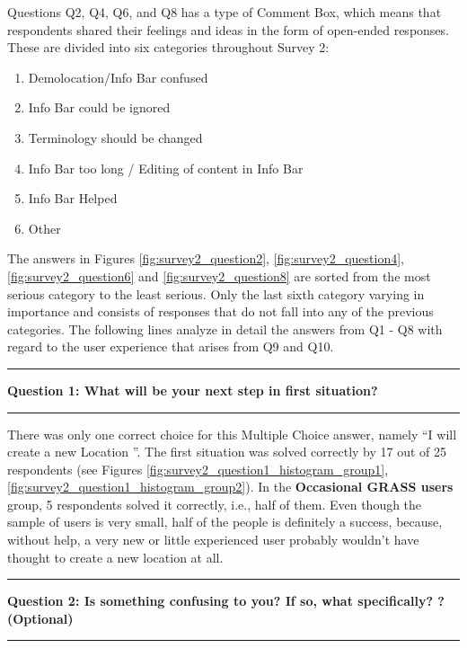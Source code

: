 \documentclass[a4paper,10pt,twoside]{article}
\begin{document}
\newpage
\noindent Questions Q2, Q4, Q6, and Q8 has a type of Comment Box,
which means that respondents shared their feelings and ideas in the
form of open-ended responses. These are divided into six categories
throughout Survey 2:

\begin{enumerate}
\item Demolocation/Info Bar confused
\item Info Bar could be ignored
\item Terminology should be changed
\item Info Bar too long / Editing of content in Info Bar
\item Info Bar Helped
\item Other
\end{enumerate}

\noindent The answers in Figures \ref{fig:survey2_question2},
\ref{fig:survey2_question4}, \ref{fig:survey2_question6} and
\ref{fig:survey2_question8} are sorted from the most serious category
to the least serious. Only the last sixth category varying in
importance and consists of responses that do not fall into any of the
previous categories. The following lines analyze in detail the answers
from Q1 - Q8 with regard to the user experience that arises from Q9
and Q10.

\par\noindent\rule{\textwidth}{0.4pt}
\noindent \textbf{Question 1: What will be your next step in first situation?}
\par\noindent\rule{\textwidth}{0.4pt}

\noindent There was only one correct choice for this Multiple Choice
answer, namely ``I will create a new Location ''. The first situation
was solved correctly by 17 out of 25 respondents (see Figures
\ref{fig:survey2_question1_histogram_group1},
\ref{fig:survey2_question1_histogram_group2}). In the
\textbf{Occasional GRASS users} group, 5 respondents solved it
correctly, i.e., half of them. Even though the sample of users is very
small, half of the people is definitely a success, because, without
help, a very new or little experienced user probably wouldn't have
thought to create a new location at all.

\par\noindent\rule{\textwidth}{0.4pt}
\noindent \textbf{Question 2: Is something confusing to you? If so, what specifically?
  ? (Optional)}
\par\noindent\rule{\textwidth}{0.4pt}
\end{document}

